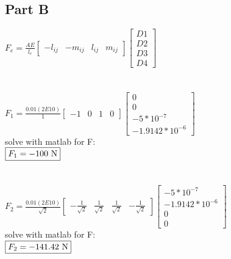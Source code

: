 \documentclass{article}
\begin{document}
\subsection*{Part B}
$F_e=\frac{AE}{l_e}\begin{bmatrix}
    -l_{ij} & -m_{ij} & l_{ij} & m_{ij}
\end{bmatrix}\begin{bmatrix}
    D1 \\ D2 \\ D3 \\ D4
\end{bmatrix}$ \\\\\\
$F_1=\frac{0.01(2E10)}{1}\begin{bmatrix}
    -1 & 0 & 1 & 0
\end{bmatrix}\begin{bmatrix}
    0 \\ 0 \\ -5*10^{-7} \\ -1.9142*10^{-6}
\end{bmatrix}$ \\
solve with matlab for F: \\
$\fbox{$F_1=-100$ N}$ \\\\\\
$F_2=\frac{0.01(2E10)}{\sqrt{2}}\begin{bmatrix}
    -\frac{1}{\sqrt{2}} & \frac{1}{\sqrt{2}} & \frac{1}{\sqrt{2}} & -\frac{1}{\sqrt{2}}
\end{bmatrix}\begin{bmatrix}
    -5*10^{-7} \\ -1.9142*10^{-6} \\ 0 \\ 0
\end{bmatrix}$ \\
solve with matlab for F: \\
$\fbox{$F_2=-141.42$ N}$
\end{document}
